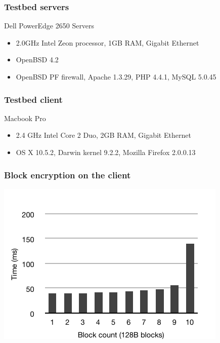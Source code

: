 \documentclass{beamer}
\begin{document}
\begin{frame}
\frametitle{Testbed servers}
Dell PowerEdge 2650 Servers
\begin{itemize}
\item 2.0GHz Intel Zeon processor, 1GB RAM, Gigabit Ethernet
\item OpenBSD 4.2
\item OpenBSD PF firewall, Apache 1.3.29, PHP 4.4.1, MySQL 5.0.45 
\end{itemize}
\end{frame}

\begin{frame}
\frametitle{Testbed client}
Macbook Pro
\begin{itemize}
\item 2.4 GHz Intel Core 2 Duo, 2GB RAM, Gigabit Ethernet
\item OS X 10.5.2, Darwin kernel 9.2.2, Mozilla Firefox 2.0.0.13
\end{itemize}
\end{frame}

\begin{frame}
\frametitle{Block encryption on the client}
\begin{center}
\includegraphics{client_field_count_new} \\
\end{center}
\end{frame}
\end{document}
